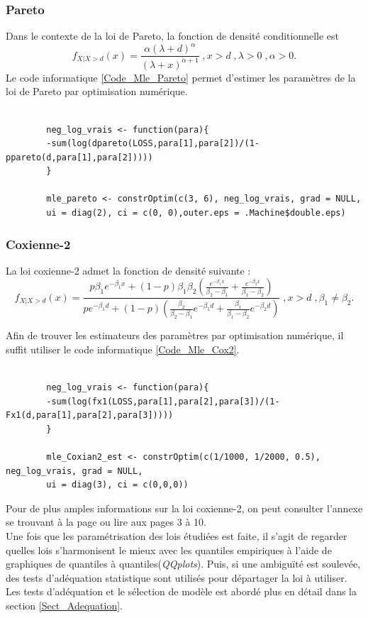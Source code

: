 		
		\subsubsection{Pareto}
		Dans le contexte de la loi de Pareto, la fonction de densité conditionnelle est
		$$f_{X|X>d}(x) = \frac{\alpha(\lambda + d)^\alpha}{(\lambda + x)^{\alpha+1}}\;, x>d\;,\lambda>0\;,\alpha>0.$$
		Le code informatique \ref{Code_Mle_Pareto} permet d'estimer les paramètres de la loi de Pareto par optimisation numérique.
		\begin{Code}\label{Code_Mle_Pareto}
		\begin{verbatim}
		
		neg_log_vrais <- function(para){
		-sum(log(dpareto(LOSS,para[1],para[2])/(1-ppareto(d,para[1],para[2]))))
		}
		
		mle_pareto <- constrOptim(c(3, 6), neg_log_vrais, grad = NULL, 
		ui = diag(2), ci = c(0, 0),outer.eps = .Machine$double.eps)
		\end{verbatim}
		\end{Code}
	
		\subsubsection{Coxienne-2}
		La loi coxienne-2 admet la fonction de densité suivante :
		$$f_{X|X>d}(x) = \frac{p\beta_1 e^{-\beta_1 x} + (1-p) \beta_1 \beta_2 \left( \frac{ e^{-\beta_1 x}}{\beta_2 - \beta_1} + \frac{ e^{-\beta_2 x}}{\beta_1 - \beta_2}\right)}
		{p e^{-\beta_1 d} + (1-p)  \left( \frac{\beta_2}{\beta_2 - \beta_1}e^{-\beta_1 d} + \frac{\beta_1}{\beta_1 - \beta_2}e^{-\beta_2 d}\right)}\;, x>d\;, \beta_1 \neq \beta_2. $$
		
		Afin de trouver les estimateurs des paramètres par optimisation numérique, il suffit utiliser le code informatique \ref{Code_Mle_Cox2}.
		\begin{Code}\label{Code_Mle_Cox2}
		\begin{verbatim}
		
		neg_log_vrais <- function(para){
		-sum(log(fx1(LOSS,para[1],para[2],para[3])/(1-Fx1(d,para[1],para[2],para[3]))))
		}
	
		mle_Coxian2_est <- constrOptim(c(1/1000, 1/2000, 0.5), neg_log_vrais, grad = NULL, 
		ui = diag(3), ci = c(0,0,0))
		\end{verbatim}
		\end{Code}
		Pour de plus amples informations sur la loi coxienne-2, on peut consulter l'annexe se trouvant à la page \pageref{Annexe_Cox2} ou lire \cite{LossModels_FurtherTopics_Klugman2013} aux pages 3 à 10.\\
		
		Une fois que les paramétrisation des lois étudiées est faite, il s'agit de regarder quelles lois s'harmonisent le mieux avec les quantiles empiriques à l'aide de graphiques de quantiles à quantiles(\textit{QQplots}). Puis, si une ambiguïté est soulevée, des tests d'adéquation statistique sont utilisés pour départager la loi à utiliser. Les tests d'adéquation et le sélection de modèle est abordé plus en détail dans la section \ref{Sect_Adequation}.
		
		